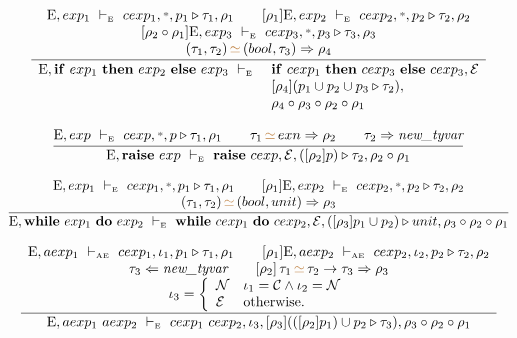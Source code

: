 \documentclass[11pt,a4paper]{article}
\newcommand{\key}[1]{\textrm{\textbf{#1}}}
\newcommand{\qualtype}[2]{#1 \triangleright #2}
\newcommand{\unify}[3]{#1\,{\color{brown}{\simeq}}\,#2 \Rightarrow #3}
\newcommand{\subst}[2]{[#1]\,#2}
\newcommand{\wildcard}{{\color{gray}\scriptstyle\textbf{*}}}
\newcommand{\compose}[2]{#1 \circ #2}
\newcommand{\Env}  {\textrm{E}}
\newcommand{\vdashE}  {\ \vdash_{\textrm{\tiny E}}\  }
\newcommand{\vdashAE} {\ \vdash_{\textrm{\tiny AE}}\ }
\newcommand{\xpc}{\mathcal{C}}
\newcommand{\xp} {\mathcal{E}}
\newcommand{\nxp}{\mathcal{N}}
\newcommand{\corenew}[1]{\textit{new\_#1}}
\begin{document}
\[
\cfrac
 {\begin{array}{c}
  \Env,exp_1 \vdashE cexp_1, \wildcard, \qualtype{p_1}{\tau_1}, \rho_1                             \qquad 
  [\rho_1]\Env, exp_2 \vdashE cexp_2, \wildcard, \qualtype{p_2}{\tau_2}, \rho_2                    \\
  {[\compose{\rho_2}{\rho_1}]\Env,exp_3 \vdashE cexp_3, \wildcard, \qualtype{p_3}{\tau_3}, \rho_3} \\
  \unify{(\tau_1,\tau_2)}{(bool,\tau_3)}{\rho_4}                                                   \\
  \end{array}}
 {\begin{array}{ll}
    \Env, \key{if}\ exp_1\ \key{then}\ exp_2\ \key{else}\ exp_3 \vdashE 
    & \key{if}\ cexp_1\ \key{then}\ cexp_3\ \key{else}\ cexp_3,  \xp 	   \\
    & [\rho_4](\qualtype{p_1 \cup p_2 \cup p_3}{\tau_2)},                  \\
    & \compose{\rho_4}{\compose{\rho_3}{\compose{\rho_2}{\rho_1}}}         \\
   \end{array}}
\]

\[
\cfrac
 {\Env,exp \vdashE cexp,\wildcard, \qualtype{p}{\tau_1},\rho_1 \qquad 
  \unify{\tau_1}{exn}{\rho_2} \qquad \tau_2\Rightarrow\corenew{tyvar}}
 {\Env, \key{raise}\ exp \vdashE \key{raise}\ cexp, \xp, \qualtype{([\rho_2]p)}{\tau_2}, \compose{\rho_2}{\rho_1}}
\]

\[
\cfrac
 {\begin{array}{c}
  \Env, exp_1 \vdashE cexp_1, \wildcard,\qualtype{p_1}{\tau_1},\rho_1           \qquad
  [\rho_1]\Env, exp_2 \vdashE cexp_2, \wildcard,\qualtype{p_2}{\tau_2},\rho_2   \\
  \unify{(\tau_1,\tau_2)}{(bool,unit)}{\rho_3} 
  \end{array}}
 {\Env,\key{while}\ exp_1\ \key{do}\ exp_2 \vdashE 
    \key{while}\ cexp_1\ \key{do}\ cexp_2, \xp, 
    \qualtype{([\rho_3]p_1 \cup p_2)}{unit}, 
    \compose{\rho_3}{\compose{\rho_2}{\rho_1}} }
\]

\[
\cfrac
 {\begin{array}{c}
  \Env,aexp_1 \vdashAE cexp_1, \iota_1, \qualtype{p_1}{\tau_1},\rho_1             \qquad
  [\rho_1]\Env,aexp_2 \vdashAE cexp_2, \iota_2, \qualtype{p_2}{\tau_2}, \rho_2    \\
  \tau_3 \Leftarrow \corenew{tyvar}                               \qquad
  \unify{\subst{\rho_2}{\tau_1}}{\tau_2\to\tau_3}{\rho_3} 		  \\
  \iota_3 = \left\{ \begin{array}{ll}
  			\nxp & \iota_1 = \xpc \wedge \iota_2 = \nxp \\
			\xp  & \textrm{otherwise.}
            \end{array}\right.
  \end{array}}
 {\Env,aexp_1\ aexp_2 \vdashE
     cexp_1\ cexp_2,\iota_3,
    [\rho_3](\qualtype{([\rho_2]p_1) \cup p_2}{\tau_3}),
    \compose{\rho_3}{\compose{\rho_2}{\rho_1}}}
\]
\end{document}
